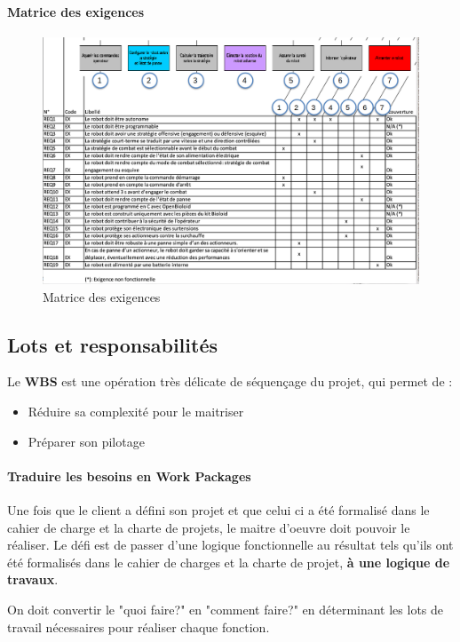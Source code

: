 \paragraph{Matrice des exigences}
\begin{figure}[!h]
\begin{center}
    \includegraphics[scale=0.5]{images/matrice_exigences.png}
    \caption{Matrice des exigences}
\end{center}
\end{figure}
\subsection{Lots et responsabilités}
Le \textbf{WBS} est une opération très délicate de séquençage du projet, qui permet de :
\begin{itemize}
	\item Réduire sa complexité pour le maitriser
	\item Préparer son pilotage
\end{itemize}
\paragraph*{Traduire les besoins en Work Packages}
Une fois que le client a défini son projet et que celui ci a été formalisé dans le cahier de charge et la charte de projets, le maitre d'oeuvre doit pouvoir le réaliser. Le défi est de passer d'une logique fonctionnelle au résultat tels qu'ils ont été formalisés dans le cahier de charges et la charte de projet, \textbf{à une logique de travaux}.

On doit convertir le "quoi faire?" en "comment faire?" en déterminant les lots de travail nécessaires pour réaliser chaque fonction.

